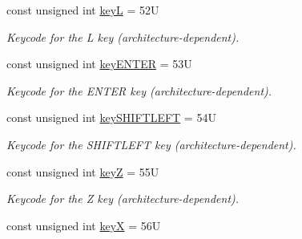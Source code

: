 \begin{DoxyCompactItemize}
\mbox{\label{namespacecimg__library__suffixed_1_1cimg_ac6516a5753d38a920d13b1d6e6016eab}} 
const unsigned int \hyperlink{namespacecimg__library__suffixed_1_1cimg_ac6516a5753d38a920d13b1d6e6016eab}{keyL} = 52U
\begin{DoxyCompactList}\small\item\em Keycode for the {\ttfamily L} key (architecture-\/dependent). \end{DoxyCompactList}\item 
\mbox{\label{namespacecimg__library__suffixed_1_1cimg_aa5eb3fc915d603fd76e553439b6ac6f4}} 
const unsigned int \hyperlink{namespacecimg__library__suffixed_1_1cimg_aa5eb3fc915d603fd76e553439b6ac6f4}{key\+E\+N\+T\+ER} = 53U
\begin{DoxyCompactList}\small\item\em Keycode for the {\ttfamily E\+N\+T\+ER} key (architecture-\/dependent). \end{DoxyCompactList}\item 
\mbox{\label{namespacecimg__library__suffixed_1_1cimg_a227a91f3f2576f1ae967e0ffa70f8f19}} 
const unsigned int \hyperlink{namespacecimg__library__suffixed_1_1cimg_a227a91f3f2576f1ae967e0ffa70f8f19}{key\+S\+H\+I\+F\+T\+L\+E\+FT} = 54U
\begin{DoxyCompactList}\small\item\em Keycode for the {\ttfamily S\+H\+I\+F\+T\+L\+E\+FT} key (architecture-\/dependent). \end{DoxyCompactList}\item 
\mbox{\label{namespacecimg__library__suffixed_1_1cimg_aff376929ef047191c1a980f61272e564}} 
const unsigned int \hyperlink{namespacecimg__library__suffixed_1_1cimg_aff376929ef047191c1a980f61272e564}{keyZ} = 55U
\begin{DoxyCompactList}\small\item\em Keycode for the {\ttfamily Z} key (architecture-\/dependent). \end{DoxyCompactList}\item 
\mbox{\label{namespacecimg__library__suffixed_1_1cimg_a970b150ff58ac510385d617fad68f437}} 
const unsigned int \hyperlink{namespacecimg__library__suffixed_1_1cimg_a970b150ff58ac510385d617fad68f437}{keyX} = 56U

\end{DoxyCompactItemize}
